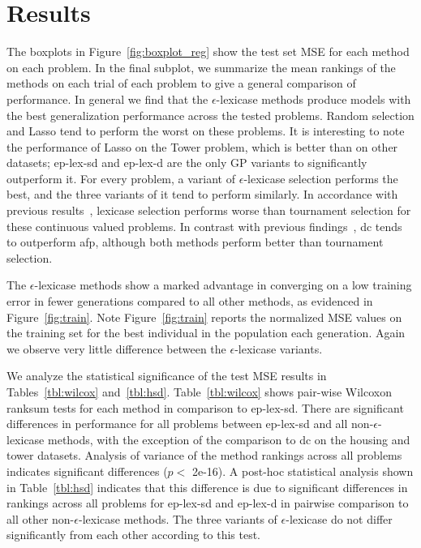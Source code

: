 \documentclass[twoside]{article}
\begin{document}
\section{Results}\label{s:results}
The boxplots in Figure~\ref{fig:boxplot_reg} show the test set MSE for each method on each problem. In the final subplot, we summarize the mean rankings of the methods on each trial of each problem to give a general comparison of performance. In general we find that the $\epsilon$-lexicase methods produce models with the best generalization performance across the tested problems. Random selection and Lasso tend to perform the worst on these problems. It is interesting to note the performance of Lasso on the Tower problem, which is better than on other datasets; ep-lex-sd and ep-lex-d are the only GP variants to significantly outperform it. For every problem, a variant of $\epsilon$-lexicase selection performs the best, and the three variants of it tend to perform similarly. In accordance with previous results~\citep{la_cava_epsilon-lexicase_2016}, lexicase selection performs worse than tournament selection for these continuous valued problems. In contrast with previous findings~\citep{schmidt_age-fitness_2011}, dc tends to outperform afp, although both methods perform better than tournament selection. 

The $\epsilon$-lexicase methods show a marked advantage in converging on a low training error in fewer generations compared to all other methods, as evidenced in Figure~\ref{fig:train}. Note Figure~\ref{fig:train} reports the normalized MSE values on the training set for the best individual in the population each generation. Again we observe very little difference between the $\epsilon$-lexicase variants. 

We analyze the statistical significance of the test MSE results in Tables~\ref{tbl:wilcox} and~\ref{tbl:hsd}. Table~\ref{tbl:wilcox} shows pair-wise Wilcoxon ranksum tests for each method in comparison to ep-lex-sd. There are significant differences in performance for all problems between ep-lex-sd and all non-$\epsilon$-lexicase methods, with the exception of the comparison to dc on the housing and tower datasets. Analysis of variance of the method rankings across all problems indicates significant differences ($p<$ 2e-16). A post-hoc statistical analysis shown in Table~\ref{tbl:hsd} indicates that this difference is due to significant differences in rankings across all problems for ep-lex-sd and ep-lex-d in pairwise comparison to all other non-$\epsilon$-lexicase methods. The three variants of $\epsilon$-lexicase do not differ significantly from each other according to this test.
\end{document}
